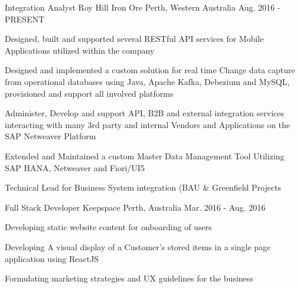 \begin{cventries}

  \cventry
    {Integration Analyst } %
    {Roy Hill Iron Ore} %
    {Perth, Western Australia} %
    {Aug. 2016 - PRESENT} %
    {
      \begin{cvitems} %
        \item {Designed,  built and supported several RESTful API services for Mobile Applications utilized within the company}
        \item {Designed and implemented a custom solution for real time Change data capture from operational databases using Java, Apache Kafka, Debezium and MySQL, provisioned and support all involved platforms}
        \item {Administer, Develop and support API, B2B and external integration services interacting with many 3rd party and internal Vendors and Applications on the SAP Netweaver Platform}
        \item {Extended and Maintained a custom Master Data Management Tool Utilizing SAP HANA, Netweaver and Fiori/UI5}
        \item {Technical Lead for Business System integration (BAU \& Greenfield Projects }
      \end{cvitems}
    }

  \cventry
    {Full Stack Developer} %
    {Keepspace} %
    {Perth, Australia} %
    {Mar. 2016 - Aug. 2016} %
    {
      \begin{cvitems} %
        \item {Developing static website content for onboarding of users}
        \item {Developing A visual display of a Customer’s stored items in a single page application using ReactJS }
        \item {Formulating marketing strategies and UX guidelines for the business}
      \end{cvitems}
    }



\end{cventries}
